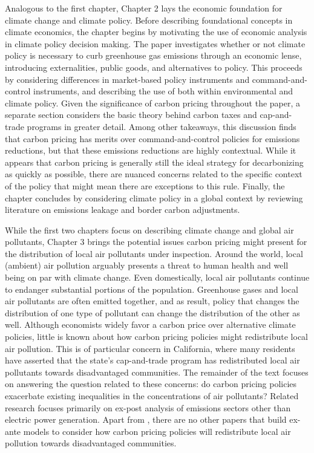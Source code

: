 Analogous to the first chapter, Chapter 2 lays the economic foundation for climate change and climate policy. Before describing foundational concepts in climate economics, the chapter begins by motivating the use of economic analysis in climate policy decision making. The paper investigates whether or not climate policy is necessary to curb greenhouse gas emissions through an economic lense, introducing externalities, public goods, and alternatives to policy. This proceeds by considering differences in market-based policy instruments and command-and-control instruments, and describing the use of both within environmental and climate policy. Given the significance of carbon pricing throughout the paper, a separate section considers the basic theory behind carbon taxes and cap-and-trade programs in greater detail. Among other takeaways, this discussion finds that carbon pricing has merits over command-and-control policies for emissions reductions, but that these emissions reductions are highly contextual. While it appears that carbon pricing is generally still the ideal strategy for decarbonizing as quickly as possible, there are nuanced concerns related to the specific context of the policy that might mean there are exceptions to this rule. Finally, the chapter concludes by considering climate policy in a global context by reviewing literature on emissions leakage and border carbon adjustments.

While the first two chapters focus on describing climate change and global air pollutants, Chapter 3 brings the potential issues carbon pricing might present for the distribution of local air pollutants under inspection. Around the world, local (ambient) air pollution arguably presents a threat to human health and well being on par with climate change. Even domestically, local air pollutants continue to endanger substantial portions of the population. Greenhouse gases and local air pollutants are often emitted together, and as result, policy that changes the distribution of one type of pollutant can change the distribution of the other as well. Although economists widely favor a carbon price over alternative climate policies, little is known about how carbon pricing policies might redistribute local air pollution. This is of particular concern in California, where many residents have asserted that the state's cap-and-trade program has redistributed local air pollutants towards disadvantaged communities. The remainder of the text focuses on answering the question related to these concerns: do carbon pricing policies exacerbate existing inequalities in the concentrations of air pollutants? Related research focuses primarily on ex-post analysis of emissions sectors other than electric power generation. Apart from \cite{weber2021dynamic}, there are no other papers that build ex-ante models to consider how carbon pricing policies will redistribute local air pollution towards disadvantaged communities. 

